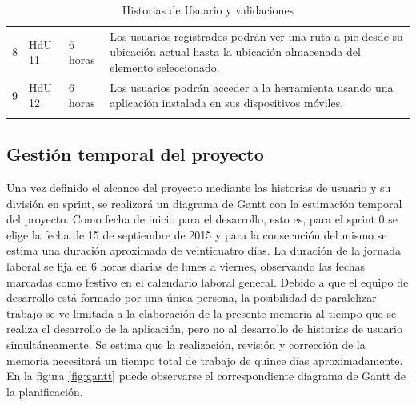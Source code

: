 \begin{longtable}{p{1cm} p{4cm} p{3cm} p{7cm}}
	8	& HdU 11	&	6 horas		&	Los usuarios registrados podrán ver una ruta a pie desde su ubicación actual hasta la ubicación 											almacenada del elemento seleccionado. \\

	\rowcolor{gray!25}
	9	& HdU 12	&	6 horas		&	Los usuarios podrán acceder a la herramienta usando una aplicación instalada en sus dispositivos móviles.\\
	\hline
	\caption{Historias de Usuario y validaciones}
	\label{tab:validaciones_HdU}
\end{longtable}

	\subsection{Gestión temporal del proyecto}
	Una vez definido el alcance del proyecto mediante las historias de usuario y su división en sprint, se realizará un diagrama de Gantt con la estimación temporal del proyecto.
	Como fecha de inicio para el desarrollo, esto es, para el sprint 0 se elige la fecha de 15 de septiembre de 2015 y para la consecución del mismo se estima una duración aproximada de veinticuatro días. La duración de la jornada laboral se fija en 6 horas diarias de lunes a viernes, observando las fechas marcadas como festivo en el calendario laboral general.
	Debido a que el equipo de desarrollo está formado por una única persona, la posibilidad de paralelizar trabajo se ve limitada a la elaboración de la presente memoria al tiempo que se realiza el desarrollo de la aplicación, pero no al desarrollo de historias de usuario simultáneamente.
	Se estima que la realización, revisión y corrección de la memoria necesitará un tiempo total de trabajo de quince días aproximadamente.
	En la figura \ref{fig:gantt} puede observarse el correspondiente diagrama de Gantt de la planificación.


